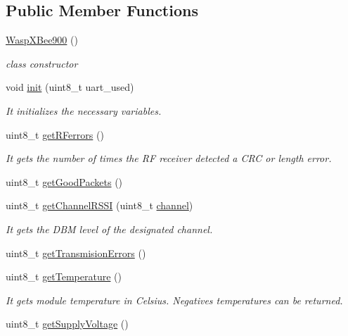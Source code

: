 \subsection*{Public Member Functions}
\begin{DoxyCompactItemize}
\item 
\hyperlink{class_wasp_x_bee900_a024687e44e4f49b0d9ff59952ed11af6}{Wasp\+X\+Bee900} ()
\begin{DoxyCompactList}\small\item\em class constructor \end{DoxyCompactList}\item 
void \hyperlink{class_wasp_x_bee900_ae8b9af86f342fdaec3f8bfc0ff4a6edb}{init} (uint8\+\_\+t uart\+\_\+used)
\begin{DoxyCompactList}\small\item\em It initializes the necessary variables. \end{DoxyCompactList}\item 
uint8\+\_\+t \hyperlink{class_wasp_x_bee900_a94b58ac3fd3f9414a7de7c3a334c6b6e}{get\+R\+Ferrors} ()
\begin{DoxyCompactList}\small\item\em It gets the number of times the RF receiver detected a C\+RC or length error. \end{DoxyCompactList}\item 
uint8\+\_\+t \hyperlink{class_wasp_x_bee900_a3bbee595551ede71a2a79dc7bc564378}{get\+Good\+Packets} ()
\item 
uint8\+\_\+t \hyperlink{class_wasp_x_bee900_af78a3358c913f80531c1aa2ade967cd1}{get\+Channel\+R\+S\+SI} (uint8\+\_\+t \hyperlink{class_wasp_x_bee_core_a28592573f397375b74148799137d1d6d}{channel})
\begin{DoxyCompactList}\small\item\em It gets the D\+BM level of the designated channel. \end{DoxyCompactList}\item 
uint8\+\_\+t \hyperlink{class_wasp_x_bee900_a6fc293e4fde6b948f6a20211d12d2834}{get\+Transmision\+Errors} ()
\item 
uint8\+\_\+t \hyperlink{class_wasp_x_bee900_a4ed9bc7321f24306bc8a643a77d245bc}{get\+Temperature} ()
\begin{DoxyCompactList}\small\item\em It gets module temperature in Celsius. Negatives temperatures can be returned. \end{DoxyCompactList}\item 
uint8\+\_\+t \hyperlink{class_wasp_x_bee900_ab3cc1ea59c32b4fc9b97cad23b7388a7}{get\+Supply\+Voltage} ()

\end{DoxyCompactItemize}
